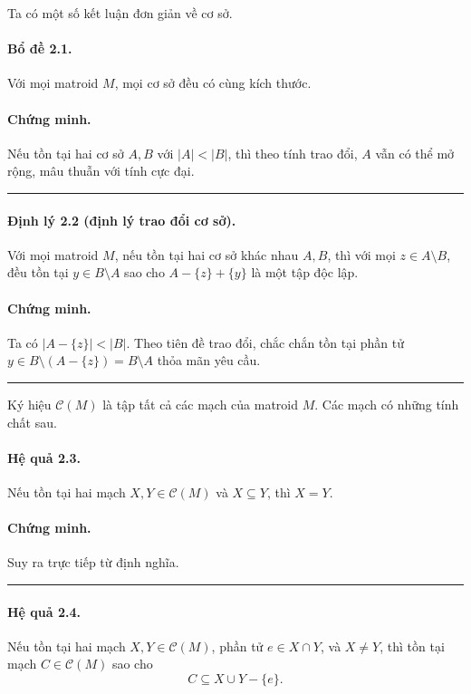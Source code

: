 \documentclass[11pt]{article}
\newcommand{\qedmark}{\hfill\rule{0.7ex}{0.7ex}}
\begin{document}
Ta có một số kết luận đơn giản về cơ sở.

\paragraph{Bổ đề 2.1.}
Với mọi matroid \(M\), mọi cơ sở đều có cùng kích thước.

\paragraph{Chứng minh.}
Nếu tồn tại hai cơ sở \(A,B\) với \(|A|<|B|\), thì theo tính trao đổi, \(A\) vẫn
có thể mở rộng, mâu thuẫn với tính cực đại. \qedmark

\paragraph{Định lý 2.2 (định lý trao đổi cơ sở).}
Với mọi matroid \(M\), nếu tồn tại hai cơ sở khác nhau \(A,B\), thì với mọi
\(z\in A\setminus B\), đều tồn tại \(y\in B\setminus A\) sao cho
\(A-\{z\}+\{y\}\) là một tập độc lập.

\paragraph{Chứng minh.}
Ta có \(|A-\{z\}|<|B|\). Theo tiên đề trao đổi, chắc chắn tồn tại phần tử
\(y\in B\setminus(A-\{z\})=B\setminus A\) thỏa mãn yêu cầu. \qedmark

Ký hiệu \(\mathcal C(M)\) là tập tất cả các mạch của matroid \(M\). Các mạch có
những tính chất sau.

\paragraph{Hệ quả 2.3.}
Nếu tồn tại hai mạch \(X,Y\in\mathcal C(M)\) và \(X\subseteq Y\), thì \(X=Y\).

\paragraph{Chứng minh.}
Suy ra trực tiếp từ định nghĩa. \qedmark

\paragraph{Hệ quả 2.4.}
Nếu tồn tại hai mạch \(X,Y\in\mathcal C(M)\), phần tử \(e\in X\cap Y\), và
\(X\ne Y\), thì tồn tại mạch \(C\in\mathcal C(M)\) sao cho
\[
  C\subseteq X\cup Y-\{e\}.
\]
\end{document}

